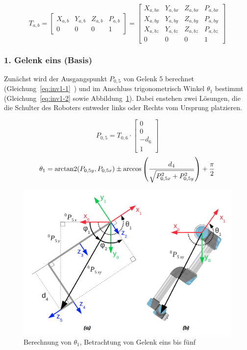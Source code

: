 \begin{equation}
    T_{a,b} = \begin{bmatrix}
                  X_{a,b} & Y_{a,b} & Z_{a,b} & P_{a,b} \\
                  0       & 0       & 0       & 1
    \end{bmatrix}
    = \begin{bmatrix}
          X_{a,bx} & Y_{a,bx} & Z_{a,bx} & P_{a,bx} \\
          X_{a,by} & Y_{a,by} & Z_{a,by} & P_{a,by} \\
          X_{a,bz} & Y_{a,bz} & Z_{a,bz} & P_{a,bz} \\
          0        & 0        & 0        & 1
    \end{bmatrix}
    \label{eq:inv-konv}
\end{equation}

\subsubsection{1. Gelenk eins (Basis)}

Zunächst wird der Ausgangspunkt $P_{0,5}$ von Gelenk 5 berechnet (Gleichung~\ref{eq:inv1-1}~\cite[4]{rasmusandersenKinematicsUR52018}) und im Anschluss trigonometrisch Winkel $\theta_1$ bestimmt (Gleichung~\ref{eq:inv1-2} sowie Abbildung~\ref{fig:inv1-1}).
Dabei enstehen zwei Lösungen, die die Schulter des Roboters entweder links oder Rechts vom Ursprung platzieren.

\begin{equation}
    P_{0,5} = T_{0,6} \cdot
    \begin{bmatrix}
        0 \\ 0 \\ -d_6 \\ 1
    \end{bmatrix}
    \label{eq:inv1-1}
\end{equation}
\begin{equation}
    \theta_1 = \operatorname{arctan2}(P_{0,5y}, P_{0,5x}) \pm \arccos \left( \frac{d_4}{ \sqrt{ P_{0,5x}^2 + P_{0,5y}^2 }  } \right) + \frac{\pi}{2}
    \label{eq:inv1-2}
\end{equation}
\begin{figure}[h]
    \centering
    \includegraphics[width = .5\textwidth]{Bilder/inv1}
    \caption{Berechnung von $\theta_1$, Betrachtung von Gelenk eins bis fünf~\cite{rasmusandersenKinematicsUR52018}}\label{fig:inv1-1}
\end{figure}

